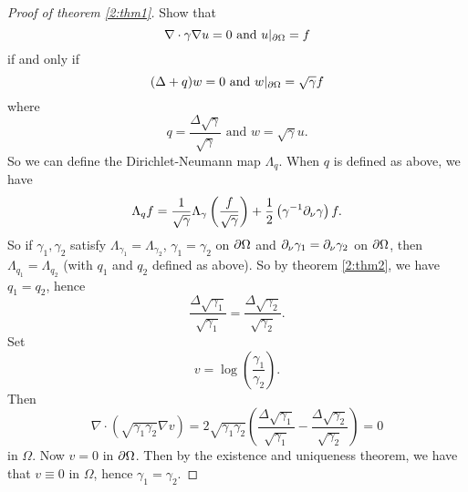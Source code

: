 \begin{proof}[Proof of theorem \ref{2:thm1}]
  Show that
  \[ \nabla \cdot \gamma \nabla u = 0 \text{ and } u|_{\partial\Omega} = f \]
  if and only if
  \[ (\Delta+q)w=0 \text{ and } w|_{\partial\Omega}=\sqrt{\gamma}f \]
  where
  \[ q = \frac{\Delta\sqrt{\gamma}}{\sqrt{\gamma}} \text{ and } w=\sqrt{\gamma}u. \]
  So we can define the Dirichlet-Neumann map $\Lambda_q$.
  When $q$ is defined as above, we have
  \[ \Lambda_q f = \frac{1}{\sqrt{\gamma}} \Lambda_\gamma \left( \frac{f}{\sqrt{\gamma}} \right) + \frac{1}{2} \left( \gamma^{-1} \partial_\nu \gamma \right) f. \]
  So if $\gamma_1,\gamma_2$ satisfy $\Lambda_{\gamma_1}=\Lambda_{\gamma_2}$, $\gamma_1=\gamma_2$ on $\partial\Omega$ and $\partial_\nu \gamma_1 = \partial_\nu \gamma_2$ on $\partial\Omega$, then $\Lambda_{q_1}=\Lambda_{q_2}$ (with $q_1$ and $q_2$ defined as above).
  So by theorem \ref{2:thm2}, we have $q_1=q_2$, hence
  \[ \frac{\Delta\sqrt{\gamma_1}}{\sqrt{\gamma_1}} = \frac{\Delta\sqrt{\gamma_2}}{\sqrt{\gamma_2}}. \]
  Set
  \[ v = \log \left(  \frac{\gamma_1}{\gamma_2} \right). \]
  Then
  \[ \nabla \cdot \left( \sqrt{\gamma_1\gamma_2} \nabla v \right) = 2 \sqrt{\gamma_1\gamma_2} \left( \frac{\Delta\sqrt{\gamma_1}}{\sqrt{\gamma_1}} - \frac{\Delta\sqrt{\gamma_2}}{\sqrt{\gamma_2}} \right) = 0 \]
  in $\Omega$.
  Now $v=0$ in $\partial\Omega$.
  Then by the existence and uniqueness theorem, we have that $v \equiv 0$ in $\Omega$, hence $\gamma_1=\gamma_2$.
\end{proof}

